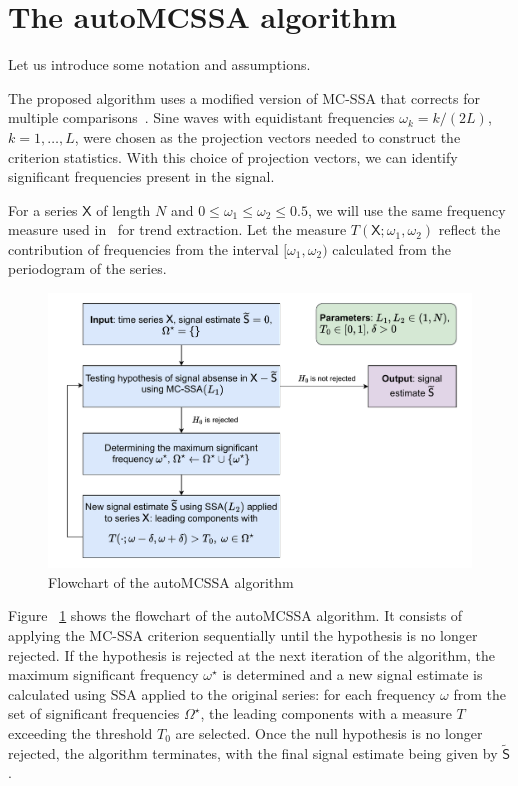 \documentclass[12pt]{article}
\begin{document}
\section{The autoMCSSA algorithm}
Let us introduce some notation and assumptions.

The proposed algorithm uses a modified version of MC-SSA that corrects for multiple comparisons~\cite{Golyandina2023}. Sine waves with equidistant frequencies $\omega_k=k/(2L)$, $k=1,\ldots,L$, were chosen as the projection vectors needed to construct the criterion statistics. With this choice of projection vectors, we can identify significant frequencies present in the signal.

For a series $\mathsf{X}$ of length $N$ and $0\leqslant\omega_1\leqslant\omega_2\leqslant0.5$, we will use the same frequency measure used in~\cite{alexandrov} for trend extraction.
Let the measure $T(\mathsf{X};\omega_1,\omega_2)$ reflect the contribution of frequencies from the interval $[\omega_1,\omega_2)$ calculated from the periodogram of the series.

\begin{figure}[htbp]
    \centering
    \includegraphics[width=\textwidth]{img/auto_mcssa_alg.pdf}
    \caption{Flowchart of the autoMCSSA algorithm}
    \label{fig:autoMCSSA_alg}
\end{figure}

Figure ~\ref{fig:autoMCSSA_alg} shows the flowchart of the autoMCSSA algorithm. It consists of applying the MC-SSA criterion sequentially until the hypothesis is no longer rejected. If the hypothesis is rejected at the next iteration of the algorithm, the maximum significant frequency $\omega^\star$ is determined and a new signal estimate is calculated using SSA applied to the original series: for each frequency $\omega$ from the set of significant frequencies $\Omega^\star$, the leading components with a measure $T$ exceeding the threshold $T_0$ are selected. Once the null hypothesis is no longer rejected, the algorithm terminates, with the final signal estimate being given by $\widetilde{\mathsf{S}}$ .
\end{document}
